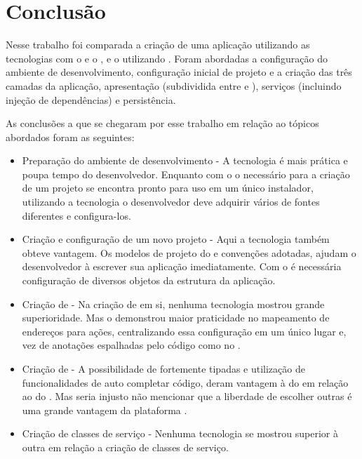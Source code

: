 \chapter{Conclusão}

Nesse trabalho foi comparada a criação de uma aplicação  utilizando as tecnologias  com o  e o , e o  utilizando . Foram abordadas a configuração do ambiente de desenvolvimento, configuração inicial de projeto e a criação das três camadas da aplicação, apresentação (subdividida entre  e ), serviços (incluindo injeção de dependências) e persistência.

As conclusões a que se chegaram por esse trabalho em relação ao tópicos abordados foram as seguintes:

\begin{itemize}
  \item Preparação do ambiente de desenvolvimento - A tecnologia  é mais prática e poupa tempo do desenvolvedor. Enquanto com o  o necessário para a criação de um projeto se encontra pronto para uso em um único instalador, utilizando a tecnologia  o desenvolvedor deve adquirir vários  de fontes diferentes e configura-los.
  \item Criação e configuração de um novo projeto - Aqui a tecnologia  também obteve vantagem. Os modelos de projeto  do  e convenções adotadas, ajudam o desenvolvedor à escrever sua aplicação imediatamente. Com o  é necessária configuração de diversos objetos da estrutura da aplicação.
  \item Criação de  - Na criação de  em si, nenhuma tecnologia mostrou grande superioridade. Mas o  demonstrou maior praticidade no mapeamento de endereços para ações, centralizando essa configuração em um único lugar e, vez de anotações espalhadas pelo código como no .
  \item Criação de  - A possibilidade de  fortemente tipadas e utilização de funcionalidades de auto completar código, deram vantagem à  do  em relação ao  do . Mas seria injusto não mencionar que a liberdade de escolher outras  é uma grande vantagem da plataforma .
  \item Criação de classes de serviço - Nenhuma tecnologia se mostrou superior à outra em relação a criação de classes de serviço.

\end{itemize}

